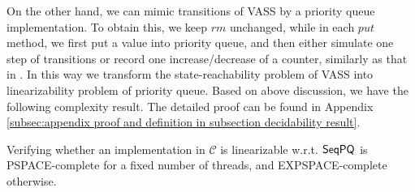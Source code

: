 On the other hand, we can mimic transitions of VASS by a priority queue implementation. To obtain this, we keep $\textit{rm}$ unchanged, while in each $\textit{put}$ method, we first put a value into priority queue, and then either simulate one step of transitions or record one increase/decrease of a counter, similarly as that in \cite{conf/esop/BouajjaniEEH13}. In this way we transform the state-reachability problem of VASS into linearizability problem of priority queue. Based on above discussion, we have the following complexity result. The detailed proof can be found in Appendix \ref{subsec:appendix proof and definition in subsection decidability result}.




\begin{theorem}
\label{theorem:complexity of priority queue}
Verifying whether an implementation in $\mathcal{C}$ is linearizable w.r.t. $\mathsf{SeqPQ}$ is PSPACE-complete for a fixed number of threads, and EXPSPACE-complete otherwise.
\end{theorem}



%
%
%
%



